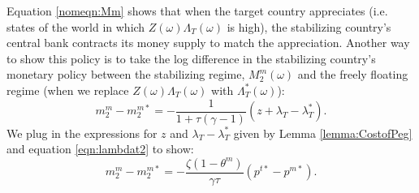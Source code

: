 Equation \eqref{nomeqn:Mm} shows that when the target country
appreciates (i.e. states of the world in which
$Z(\omega)\Lambda_T(\omega)$ is high), the stabilizing country's
central bank contracts its money supply to match the appreciation.
Another way to show this policy is to take the log difference in the
stabilizing country's monetary policy between the stabilizing regime,
$M^m_2(\omega)$ and the freely floating regime (when we replace
$Z(\omega)\Lambda_T(\omega)$ with $\Lambda_T^\ast(\omega)$):
\begin{equation*}
  m^m_2 - m^{m \ast}_2
  = - \frac{1}{1 + \tau(\gamma - 1)} (z + \lambda_T - \lambda_T^\ast).
\end{equation*}
We plug in the expressions for $z$ and $\lambda_T - \lambda_T^\ast$
given by Lemma \ref{lemma:CostofPeg} and equation \eqref{eqn:lambdat2}
to show:
\begin{equation*}
  m^m_2 - m^{m \ast}_2
  = - \frac{\zeta (1 - \theta^m)}{\gamma \tau}
  \left( p^{t \ast} - p^{m \ast} \right).
\end{equation*}

